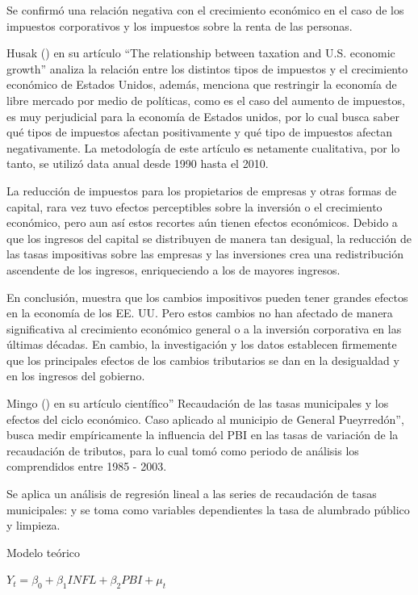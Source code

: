 \documentclass[
  jou,
  floatsintext,
  longtable,
  a4paper,
  nolmodern,
  notxfonts,
  notimes,
  12pt,
  colorlinks=true,linkcolor=blue,citecolor=blue,urlcolor=blue]{apa7}
\begin{document}
Se confirmó una relación negativa con el crecimiento económico en el
caso de los impuestos corporativos y los impuestos sobre la renta de las
personas.

Husak () en su artículo
``The relationship between taxation and U.S. economic growth'' analiza
la relación entre los distintos tipos de impuestos y el crecimiento
económico de Estados Unidos, además, menciona que restringir la economía
de libre mercado por medio de políticas, como es el caso del aumento de
impuestos, es muy perjudicial para la economía de Estados unidos, por lo
cual busca saber qué tipos de impuestos afectan positivamente y qué tipo
de impuestos afectan negativamente. La metodología de este artículo es
netamente cualitativa, por lo tanto, se utilizó data anual desde 1990
hasta el 2010.

La reducción de impuestos para los propietarios de empresas y otras
formas de capital, rara vez tuvo efectos perceptibles sobre la inversión
o el crecimiento económico, pero aun así estos recortes aún tienen
efectos económicos. Debido a que los ingresos del capital se distribuyen
de manera tan desigual, la reducción de las tasas impositivas sobre las
empresas y las inversiones crea una redistribución ascendente de los
ingresos, enriqueciendo a los de mayores ingresos.

En conclusión, muestra que los cambios impositivos pueden tener grandes
efectos en la economía de los EE. UU. Pero estos cambios no han afectado
de manera significativa al crecimiento económico general o a la
inversión corporativa en las últimas décadas. En cambio, la
investigación y los datos establecen firmemente que los principales
efectos de los cambios tributarios se dan en la desigualdad y en los
ingresos del gobierno.

Mingo () en su artículo
científico'' Recaudación de las tasas municipales y los efectos del
ciclo económico. Caso aplicado al municipio de General Pueyrredón'',
busca medir empíricamente la influencia del PBI en las tasas de
variación de la recaudación de tributos, para lo cual tomó como periodo
de análisis los comprendidos entre 1985 - 2003.

Se aplica un análisis de regresión lineal a las series de recaudación de
tasas municipales: y se toma como variables dependientes la tasa de
alumbrado público y limpieza.

Modelo teórico

\(Y_t= \beta_{0} + \beta_{1}INFL + \beta_{2}PBI + \mu_{t}\)
\end{document}
